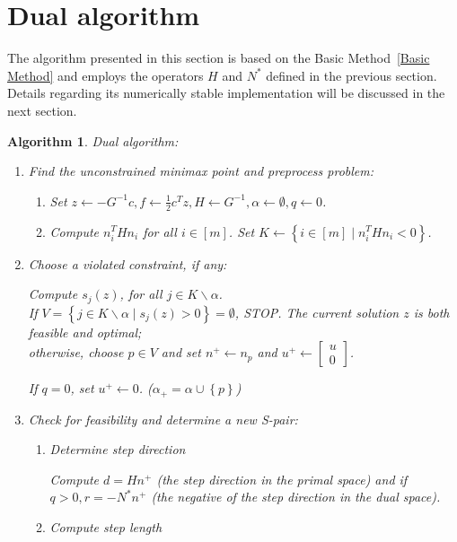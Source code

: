 \documentclass{article}
\newtheorem{algorithm}{Algorithm}
\begin{document}
	\section{Dual algorithm}\label{section4}
	The algorithm presented in this section is based on the Basic Method~\ref{Basic Method} and employs the operators $H$ and $N^{\ast}$ defined in the previous section.  
	Details regarding its numerically stable implementation will be discussed in the next section.
	\begin{algorithm}{Dual algorithm:}\label{dual algorithm}
		\begin{enumerate}
			\item[Step 0] Find the unconstrained minimax point and preprocess problem:
			\begin{enumerate}
				\item Set $z\leftarrow -G^{-1}c, f\leftarrow\frac{1}{2}c^{T}z,H\leftarrow G^{-1},\alpha\leftarrow\emptyset,q\leftarrow0$.
				\item Compute $n_{i}^{T}Hn_{i}$ for all $i \in [m]$. Set $K \leftarrow \left\lbrace i\in[m] \mid n_{i}^{T}Hn_{i} < 0\right\rbrace$.
			\end{enumerate}
			\item[Step 1] Choose a violated constraint, if any:
			
			Compute $s_{j}(z)$, for all $j\in K\backslash\alpha$.\\
			If $V = \left\lbrace j\in K\backslash\alpha \mid s_{j}(z)>0\right\rbrace=\emptyset$, STOP. The current solution $z$ is both feasible and optimal;\\
			otherwise, choose $p\in V$ and set $n^{+} \leftarrow n_{p}$ and $u^{+} \leftarrow \begin{bmatrix}
				u\\0
			\end{bmatrix}$.
			
			If $q = 0$, set $u^{+}\leftarrow0$. ($\alpha_{+} = \alpha\cup\left\lbrace p\right\rbrace $)
			
			\item[Step 2] Check for feasibility and determine a new S-pair:
			
			\begin{enumerate}
				\item Determine step direction
				
				Compute $d = Hn^{+}$ (the step direction in the primal space) and if $q>0, r = -N^{\ast}n^{+}$ (the negative of the step direction in the dual space).
				
				\item Compute step length
				

\end{enumerate}
\end{enumerate}
\end{algorithm}
\end{document}
